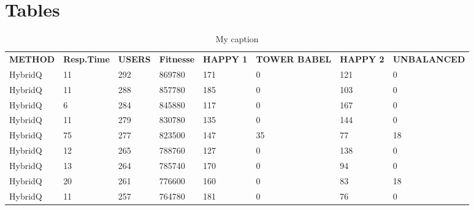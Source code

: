 \chapter{Tables}


\begin{table}[h!]
\centering
\caption{My caption}
\label{my-label}
\begin{tabular}{llllllll}
\rowcolor[HTML]{EFEFEF} 
\textbf{METHOD} & \textbf{Resp.Time} & \textbf{USERS} & \textbf{Fitnesse} & \textbf{HAPPY 1} & \textbf{TOWER BABEL} & \textbf{HAPPY 2} & \textbf{UNBALANCED} \\
HybridQ                & 11                     & 292            & 869780                  & 171              & 0                    & 121              & 0                   \\
HybridQ                & 11                     & 288            & 857780                  & 185              & 0                    & 103              & 0                   \\
HybridQ                & 6                      & 284            & 845880                  & 117              & 0                    & 167              & 0                   \\
HybridQ                & 11                     & 279            & 830780                  & 135              & 0                    & 144              & 0                   \\
HybridQ                & 75                     & 277            & 823500                  & 147              & 35                   & 77               & 18                  \\
HybridQ                & 12                     & 265            & 788760                  & 127              & 0                    & 138              & 0                   \\
HybridQ                & 13                     & 264            & 785740                  & 170              & 0                    & 94               & 0                   \\
HybridQ                & 20                     & 261            & 776600                  & 160              & 0                    & 83               & 18                  \\
HybridQ                & 11                     & 257            & 764780                  & 181              & 0                    & 76               & 0                   \\

\end{tabular}
\end{table}
